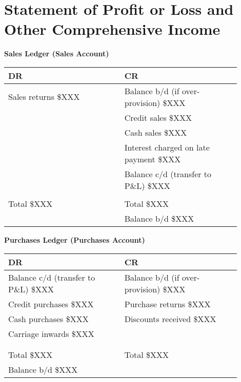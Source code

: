 \section{Statement of Profit or Loss and Other Comprehensive Income}

\textbf{Sales Ledger (Sales Account)}\\[3pt]
\begin{tabular}{@{}p{0.45\linewidth} p{0.45\linewidth}@{}}
\textbf{DR} & \textbf{CR} \\ \midrule
Sales returns \hfill \$XXX & Balance b/d (if over-provision) \hfill \$XXX \\
& Credit sales \hfill \$XXX \\
& Cash sales \hfill \$XXX \\
& Interest charged on late payment \hfill \$XXX \\
& Balance c/d (transfer to P\&L) \hfill \$XXX \\[3pt]
\multicolumn{2}{c}{\hrulefill} \\
Total \hfill \$XXX & Total \hfill \$XXX \\[6pt]
& Balance b/d \hfill \$XXX \\
\end{tabular}

\vspace{1cm}

\textbf{Purchases Ledger (Purchases Account)}\\[3pt]
\begin{tabular}{@{}p{0.45\linewidth} p{0.45\linewidth}@{}}
\textbf{DR} & \textbf{CR} \\ \midrule
Balance c/d (transfer to P\&L) \hfill \$XXX & Balance b/d (if over-provision) \hfill \$XXX \\
Credit purchases \hfill \$XXX & Purchase returns \hfill \$XXX \\
Cash purchases \hfill \$XXX & Discounts received \hfill \$XXX \\
Carriage inwards \hfill \$XXX & \\
& \\[3pt]
\multicolumn{2}{c}{\hrulefill} \\
Total \hfill \$XXX & Total \hfill \$XXX \\[6pt]
Balance b/d \hfill \$XXX & \\
\end{tabular}

\vspace{1cm}

